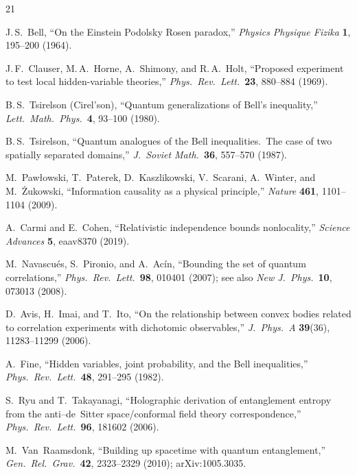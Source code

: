 \documentclass[11pt,a4paper]{article}
\theoremstyle{definition}
\theoremstyle{remark}
\begin{document}
\begin{thebibliography}{21}

J.\,S.~Bell,
``On the Einstein Podolsky Rosen paradox,''
\emph{Physics Physique Fizika} \textbf{1}, 195--200 (1964).

J.\,F.~Clauser, M.\,A.~Horne, A.~Shimony, and R.\,A.~Holt,
``Proposed experiment to test local hidden-variable theories,''
\emph{Phys.\ Rev.\ Lett.}\ \textbf{23}, 880--884 (1969).

B.\,S.~Tsirelson (Cirel'son),
``Quantum generalizations of Bell's inequality,''
\emph{Lett.\ Math.\ Phys.}\ \textbf{4}, 93--100 (1980).

B.\,S.~Tsirelson,
``Quantum analogues of the Bell inequalities.\ The case of two spatially separated domains,''
\emph{J.\ Soviet Math.}\ \textbf{36}, 557--570 (1987).

M.~Paw{\l}owski, T.~Paterek, D.~Kaszlikowski, V.~Scarani, A.~Winter, and M.~{\.Z}ukowski,
``Information causality as a physical principle,''
\emph{Nature} \textbf{461}, 1101--1104 (2009).

A.~Carmi and E.~Cohen,
``Relativistic independence bounds nonlocality,''
\emph{Science Advances} \textbf{5}, eaav8370 (2019).

M.~Navascu\'es, S.~Pironio, and A.~Ac\'in,
``Bounding the set of quantum correlations,''
\emph{Phys.\ Rev.\ Lett.}\ \textbf{98}, 010401 (2007);
see also \emph{New J.\ Phys.}\ \textbf{10}, 073013 (2008).

D.~Avis, H.~Imai, and T.~Ito,
``On the relationship between convex bodies related to correlation experiments with dichotomic observables,''
\emph{J.\ Phys.\ A} \textbf{39}(36), 11283--11299 (2006).

A.~Fine,
``Hidden variables, joint probability, and the Bell inequalities,''
\emph{Phys.\ Rev.\ Lett.}\ \textbf{48}, 291--295 (1982).

S.~Ryu and T.~Takayanagi,
``Holographic derivation of entanglement entropy from the anti--de~Sitter space/conformal field theory correspondence,''
\emph{Phys.\ Rev.\ Lett.}\ \textbf{96}, 181602 (2006).

M.~Van~Raamsdonk,
``Building up spacetime with quantum entanglement,''
\emph{Gen.\ Rel.\ Grav.}\ \textbf{42}, 2323--2329 (2010);
arXiv:1005.3035.


\end{thebibliography}
\end{document}

